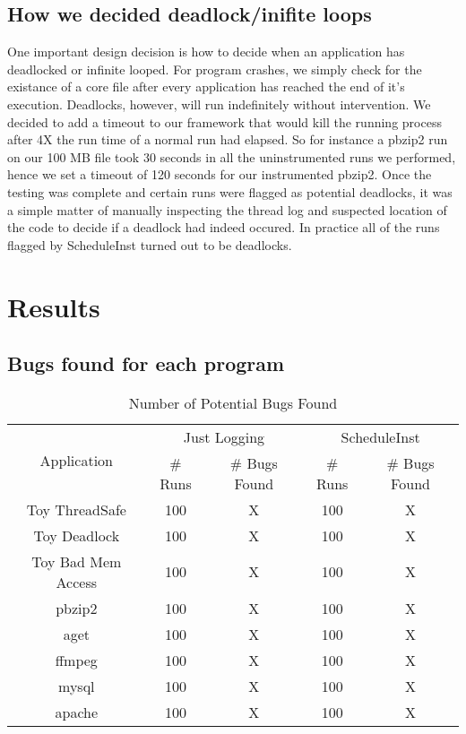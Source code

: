 \documentclass[10pt,]{article} %
\begin{document}
\subsection{How we decided deadlock/inifite loops}

One important design decision is how to decide when an application has deadlocked or infinite looped.  For program crashes, we simply check for the existance of a core file after every application has reached the end of it's execution. Deadlocks, however, will run indefinitely without intervention. We decided to add a timeout to our framework that would kill the running process after 4X the run time of a normal run had elapsed. So for instance a pbzip2 run on our 100 MB file took 30 seconds in all the uninstrumented runs we performed, hence we set a timeout of 120 seconds for our instrumented pbzip2.  Once the testing was complete and certain runs were flagged as potential deadlocks, it was a simple matter of manually inspecting the thread log and suspected location of the code to decide if a deadlock had indeed occured. In practice all of the runs flagged by ScheduleInst turned out to be deadlocks. 


\section{Results}


\subsection{Bugs found for each program}
\begin{table}
\centering
\begin{tabular}{ |c|c|c|c|c| }
\hline
\multirow{2}{*}{Application} & \multicolumn{2}{|c|}{Just Logging} & \multicolumn{2}{|c|}{ScheduleInst} \\ \cline{2-5}
& \# Runs & \# Bugs Found & \# Runs & \# Bugs Found \\ \hline \hline
Toy ThreadSafe & 100 &X& 100 &X \\ \hline
Toy Deadlock & 100 &X& 100 &X \\ \hline
Toy Bad Mem Access & 100 &X& 100 &X \\ \hline
pbzip2 & 100 &X& 100 &X \\ \hline
aget & 100 &X& 100 &X \\ \hline
ffmpeg & 100 &X& 100 &X \\ \hline
mysql & 100 &X& 100 &X \\ \hline
apache & 100 &X& 100 &X \\ \hline

\end{tabular}
\caption{Number of Potential Bugs Found}
\label{bugsFound}
\end{table}
\end{document}
